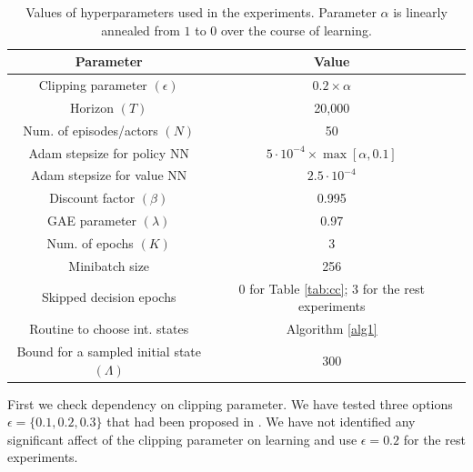 \documentclass[11pt]{article}
\theoremstyle{definition}
\numberwithin{equation}{section}
\begin{document}
\begin{table}[!ht]
\centering%
\begin{tabular}{|c|c|c|}
  \hline
  Parameter  & Value\\\hline
  Clipping parameter $(\epsilon)$ & $0.2\times \alpha$ \\
  Horizon $(T)$ & 20,000 \\
  Num. of episodes/actors $(N)$  & 50 \\
  Adam stepsize for policy NN& $5\cdot 10^{-4}\times \max[ \alpha,0.1]  $   \\
  Adam stepsize for value NN& $2.5\cdot 10^{-4}  $ \\
  Discount factor $(\beta)$  & 0.995  \\
  GAE parameter $(\lambda)$  & 0.97 \\
  Num. of epochs $(K)$& 3\\
  Minibatch size & 256\\
  Skipped decision epochs & $0$ for Table \ref{tab:cc}; $3$ for the rest experiments\\
  Routine to choose int. states & Algorithm \ref{alg1}\\
  Bound for a sampled initial state $(\Lambda)$ & 300
\end{tabular}
\caption[]{Values of hyperparameters used in the experiments. Parameter $\alpha$ is linearly annealed from $1$ to $0$ over the course of learning.}\label{tab:par}
\end{table}

First we check dependency on clipping parameter. We have tested three options $\epsilon = \{0.1,0.2, 0.3\}$ that had been proposed in \cite{Schulman2017}. We have not identified any significant affect of the clipping parameter on learning and use $\epsilon = 0.2$ for the rest experiments.
\end{document}
